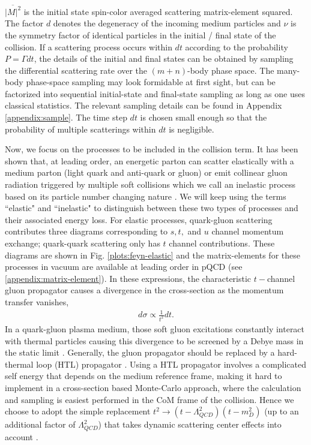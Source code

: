 \documentclass[aps, prc, reprint, amsmath, groupedaddress, nofootinbib]{revtex4-1}
\begin{document}
$\overline{|M|^2}$ is the initial state spin-color averaged scattering matrix-element squared.
The factor $d$ denotes the degeneracy of the incoming medium particles and $\nu$ is the symmetry factor of identical particles in the initial / final state of the collision.
If a scattering process occurs within $dt$ according to the probability $P=\Gamma dt$, the details of the initial and final states can be obtained by sampling the differential scattering rate over the $(m+n)$-body phase space.
The many-body phase-space sampling may look formidable at first sight, but can be factorized into sequential initial-state and final-state sampling as long as one uses classical statistics.
The relevant sampling details can be found in Appendix \ref{appendix:sample}.
The time step $dt$ is chosen small enough so that the probability of multiple scatterings within $dt$ is negligible. 

Now, we focus on the processes to be included in the collision term.
It has been shown that, at leading order, an energetic parton can scatter elastically with a medium parton (light quark and anti-quark or gluon) or emit collinear gluon radiation triggered by multiple soft collisions which we call an inelastic process based on its particle number changing nature \cite{Arnold:2002zm}.
We will keep using the terms ``elastic" and ``inelastic" to distinguish between these two types of processes and their associated energy loss.
For elastic processes, quark-gluon scattering contributes three diagrams corresponding to $s, t,$ and $u$ channel momentum exchange; quark-quark scattering only has $t$ channel contributions. 
These diagrams are shown in Fig. \ref{plots:feyn-elastic} and the matrix-elements for these processes in vacuum are available at leading order in pQCD (see \ref{appendix:matrix-element}).
In these expressions, the characteristic $t-$channel gluon propagator causes a divergence in the cross-section as the momentum transfer vanishes,
\begin{eqnarray}
d\sigma \propto \frac{1}{t^2} dt.
\end{eqnarray}
In a quark-gluon plasma medium, those soft gluon excitations constantly interact with thermal particles causing this divergence to be screened by a Debye mass in the static limit \cite{Moore:2004tg}.
Generally, the gluon propagator should be replaced by a hard-thermal loop (HTL) propagator \cite{Peshier:1998dy}.
Using a HTL propagator involves a complicated self energy that depends on the medium reference frame, making it hard to implement in a cross-section based Monte-Carlo approach, where the calculation and sampling is easiest performed in the CoM frame of the collision.
Hence we choose to adopt the simple replacement $t^2 \rightarrow (t-\Lambda_{QCD}^2)(t - m_D^2)$ (up to an additional factor of $\Lambda_{QCD}^2$) that takes  dynamic scattering center effects into account \cite{Djordjevic:2008iz}.
\end{document}
